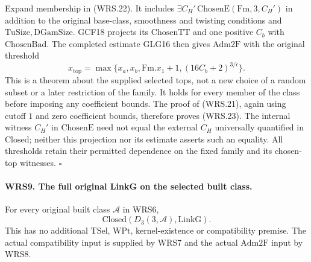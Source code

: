 \documentclass[11pt,a4paper]{article}
\numberwithin{equation}{section}
\theoremstyle{remark}\newtheorem{remark}[theorem]{Remark}
\begin{document}
Expand membership in (WRS.22).  It includes
\(\exists C_H'\,\mathrm{ChosenE}(\mathrm{Fm},3,C_H')\)
in addition to the original base-class, smoothness and twisting
conditions and \(\mathrm{TuSize},\mathrm{DGamSize}\).
GCF18 projects its \(\mathrm{ChosenTT}\) and one positive
\(C_b\) with \(\mathrm{ChosenBad}\).  The completed estimate
GLG16 then gives \(\mathrm{Adm2F}\) with the original threshold
\[
 x_{\mathrm{top}}=
 \max\{x_a,x_b,\mathrm{Fm}.x_1+1,
                         (16C_b+2)^{3/\epsilon}\}.
 \tag{WRS.24}
\]
This is a theorem about the supplied selected tops, not a new
choice of a random subset or a later restriction of the family.
It holds for every member of the class before imposing any
coefficient bounds.  The proof of (WRS.21), again using cutoff
\(1\) and zero coefficient bounds, therefore proves (WRS.23).
The internal witness \(C_H'\) in \(\mathrm{ChosenE}\) need
not equal the external \(C_H\) universally quantified in
\(\mathrm{Closed}\); neither this projection nor its estimate
asserts such an equality.  All thresholds retain their permitted
dependence on the fixed family and its chosen-top witnesses.
\hfill\(\square\)

\paragraph{WRS9. The full original LinkG on the selected built class.}
\label{claim:WRS9}
For every original built class \(\mathcal A\) in WRS6,
\[
             \mathrm{Closed}(D_3(3,\mathcal A),\mathrm{LinkG}).
 \tag{WRS.25}
\]
This has no additional \(\mathrm{TSel}\), \(\mathrm{WPt}\),
kernel-existence or compatibility premise.  The actual compatibility
input is supplied by WRS7 and the actual \(\mathrm{Adm2F}\)
input by WRS8.
\end{document}
